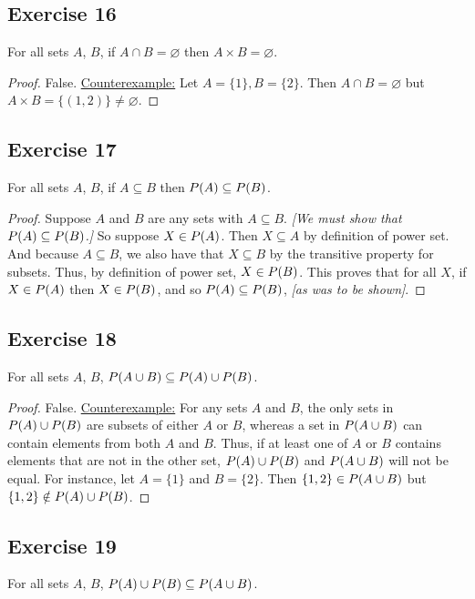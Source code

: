\documentclass[14pt]{extarticle}
\let\mathscr\relax
\newcommand{\ps}{\mathscr{P}}
\newcommand{\es}{\varnothing}
\begin{document}
\subsection{Exercise 16}
For all sets $A$, $B$, if \(A \cap B = \es\) then \(A \times B = \es\).

\begin{proof}
  False. \underline{Counterexample:} Let \(A = \{1\}, B = \{2\}\).
  Then \(A \cap B = \es\) but \(A \times B = \{(1, 2)\} \neq \es\).
\end{proof}

\subsection{Exercise 17}
For all sets $A$, $B$, if \(A \subseteq B\) then \(\ps(A) \subseteq \ps(B)\).

\begin{proof}
  Suppose $A$ and $B$ are any sets with \(A \subseteq B\). {\it [We must show that \(\ps(A) \subseteq \ps(B)\).]}
  So suppose \(X \in \ps(A)\). Then \(X \subseteq A\) by definition of power set. And because \(A \subseteq B\),
  we also have that \(X \subseteq B\) by the transitive property for subsets. Thus, by definition of power set,
  \(X \in \ps(B)\). This proves that for all $X$, if \(X \in \ps(A)\) then \(X \in \ps(B)\), and so
  \(\ps(A) \subseteq \ps(B)\), {\it [as was to be shown]}.
\end{proof}

\subsection{Exercise 18}
For all sets $A$, $B$, \(\ps(A \cup B) \subseteq \ps(A) \cup \ps(B)\).

\begin{proof}
  False. \underline{Counterexample:} For any sets $A$ and $B$, the only sets in \(\ps(A) \cup \ps(B)\) are subsets of
  either $A$ or $B$, whereas a set in \(\ps(A \cup B)\) can contain elements from both $A$ and $B$. Thus, if at least
  one of $A$ or $B$ contains elements that are not in the other set, \(\ps(A) \cup \ps(B)\) and \(\ps(A \cup B)\)
  will not be equal. For instance, let \(A = \{1\}\) and \(B = \{2\}\). Then \(\{1, 2\} \in \ps(A \cup B)\) but
  \(\{1, 2\} \notin \ps(A) \cup \ps(B)\).
\end{proof}

\subsection{Exercise 19}
For all sets $A$, $B$, \(\ps(A) \cup \ps(B) \subseteq \ps(A \cup B)\).
\end{document}
